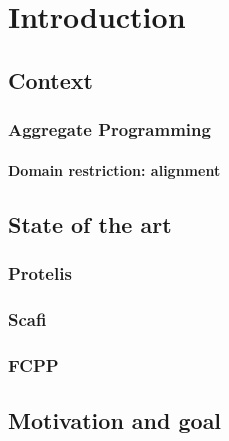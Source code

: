 \chapter{Introduction}\label{introduction}

\section{Context}
\subsection{Aggregate Programming}
\subsubsection{Domain restriction: alignment}

\section{State of the art}
\subsection{Protelis}
\subsection{Scafi}
\subsection{FCPP}

\section{Motivation and goal}